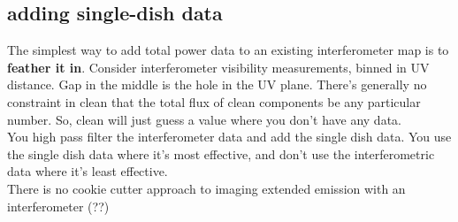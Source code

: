 \documentclass[a4paper]{article}
\begin{document}
\subsection{adding single-dish data}

The simplest way to add total power data to an existing interferometer map is to \textbf{feather it in}. Consider interferometer visibility measurements, binned in UV distance. Gap in the middle is the hole in the UV plane. There's generally no constraint in clean that the total flux of clean components be any particular number. So, clean will just guess a value where you don't have any data. \\

You high pass filter the interferometer data and add the single dish data. You use the single dish data where it's most effective, and don't use the interferometric data where it's least effective. \\ 

There is no cookie cutter approach to imaging extended emission with an interferometer (??) 
\end{document}
